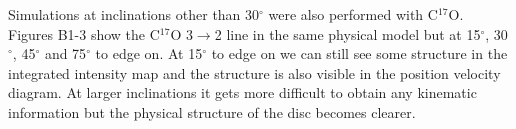 \documentclass[useAMS,usenatbib]{mn2e}
\begin{document}
Simulations at inclinations other than 30$^\circ$ were also performed with C$^{17}$O. Figures B1-3 show the C$^{17}$O 3$\rightarrow$2 line in the same physical model but at 15$^\circ$, 30$^\circ$, 45$^\circ$ and 75$^\circ$ to edge on. At 15$^\circ$ to edge on we can still see some structure in the integrated intensity map and the structure is also visible in the position velocity diagram. At larger inclinations it gets more difficult to obtain any kinematic information but the physical structure of the disc becomes clearer.

\bsp
\label{lastpage}
\end{document}
